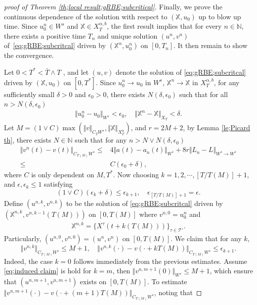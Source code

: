 \documentclass{article}
\numberwithin{equation}{section}
\newcommand{\m}{\mathbb}
\newcommand{\ml}{\mathcal}
\begin{document}
\begin{proof}[proof of Theorem \ref{th;local result;gRBE;subcritical}]
    \par Finally, we prove the continuous dependence of the solution with respect to $(\m X,u_0)$ up to blow up time. Since $u_0^n\in W^s$ and $\m X\in X_T^{\alpha,b}$, the first result implies that for every $n\in\m N$, there exists a positive time $T_n$ and unique solution $(u^n,v^n)$ of\ \eqref{eq;gRBE;subcritcal} driven by $(\m X^n,u_0^n)$ on $[0,T_n]$. It then remain to show the convergence. 
    \par Let $0<T^*< \bar T\wedge T$ , and let $(u,v)$ denote the solution of \eqref{eq;gRBE;subcritcal} driven by $(\m X,u_0)$ on $[0,T^*]$. Since $u_0^{n}\to u_0$ in $W^s$, $\m X^n\to \m X$ in $X_T^{\alpha,b}$, for any sufficiently small $\delta>0$ and $\epsilon_0>0$, there exists $N(\delta,\epsilon_0)$ such that for all $n>N(\delta,\epsilon_0)$
    \begin{align*}
        \Vert u_0^n-u_0\Vert_{W^s}<\epsilon_0,\quad \Vert \m X^n-\m X\Vert_{X_T}<\delta.
    \end{align*}
    Let $M=(1\vee C)\max (\Vert v\Vert_{C_TW^s},\Vert \m X\Vert_{X_T^\alpha})$, and $r=2M+2$, by Lemma \ref{le;Picard th}, there exists $N\in \m N$ such that for any $n> N\vee N(\delta,\epsilon_0)$
\begin{align*}
    \Vert v^{n}(t)-v(t)\Vert_{C_{T(M)}W^s}\leq&  4\Vert a(t)-a_n(t)\Vert_{W^s}+8r\Vert L_n-L\Vert_{W^s\to W^s}\\
    \leq&C(\epsilon_0+\delta),
\end{align*}
    where $C$ is only dependent on $M,T^*$. Now choosing $k=1,2,\cdots,[T/T(M)]+1$, and $\epsilon,\epsilon_{k}\leq 1$ satisfying
    \begin{equation}
      (1\vee C)(\epsilon_k+\delta)\leq\epsilon_{k+1},\quad \epsilon_{[T/T(M)]+1}=\epsilon.
    \end{equation}
  Define $(u^{n,k},v^{n,k})$ to be the solution of \eqref{eq;gRBE;subcritcal} driven by $(\m X^{n,k},v^{n,k-1}(T(M)))$ on $[0,T(M)]$ where $v^{n,0}=u^n_0$ and 
  \begin{align*}
      \m X^{n,k}=\{X^\tau(t+k(T(M)))\}_{\tau\in\ml T'}.
  \end{align*}
  Particularly, $(u^{n,0},v^{n,0})=(u^n,v^n)$ on $[0,T(M)]$. We claim that for any $k$, 
\begin{equation}\label{eq;induced claim}
    \Vert v^{n,k}\Vert_{C_{T(M)}W^s}\leq M+1,\quad \Vert v^{n,k}(\cdot)-v(\cdot+kT(M))\Vert_{C_{T(M)}W^s}\leq \epsilon_{k+1}.
\end{equation}
 Indeed, the case $k=0$ follows immediately from the previous estimates. Assume \eqref{eq;induced claim}  is hold for $k=m$, then $\Vert v^{n,m+1}(0)\Vert_{W^{s}}\leq M+1$, which ensure that $(u^{n,m+1},v^{n,m+1})$ exists on $[0,T(M)]$. To estimate $\Vert v^{n,m+1}(\cdot)-v(\cdot+(m+1)T(M))\Vert_{C_{T(M)}W^s}$, noting that 

\end{proof}
\end{document}
